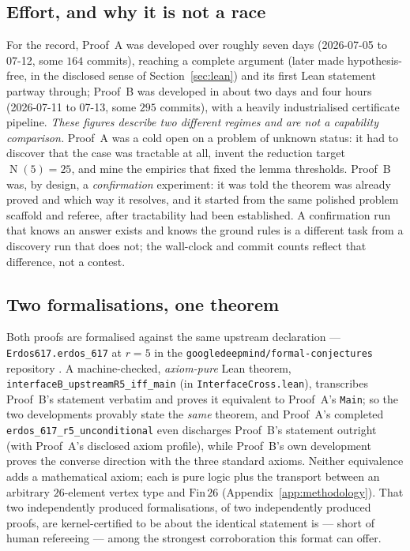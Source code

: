 \documentclass[11pt,reqno]{amsart}
\theoremstyle{definition}
\theoremstyle{remark}
\DeclareMathOperator{\Ncap}{N}
\begin{document}
\subsection{Effort, and why it is not a race}
For the record, Proof~A was developed over roughly seven days (2026-07-05 to 07-12, some
$164$ commits), reaching a complete argument (later made hypothesis-free, in the disclosed
sense of Section~\ref{sec:lean}) and its first Lean statement partway through; Proof~B was developed in about two days and four hours (2026-07-11 to
07-13, some $295$ commits), with a heavily industrialised certificate pipeline. \emph{These
figures describe two different regimes and are not a capability comparison.} Proof~A was a
cold open on a problem of unknown status: it had to discover that the case was tractable at
all, invent the reduction target $\Ncap(5)=25$, and mine the empirics that fixed the lemma
thresholds. Proof~B was, by design, a \emph{confirmation} experiment: it was told the
theorem was already proved and which way it resolves, and it started from the same polished
problem scaffold and referee, after tractability had been established. A confirmation run
that knows an answer exists and knows the ground rules is a different task from a discovery
run that does not; the wall-clock and commit counts reflect that difference, not a contest.

\subsection{Two formalisations, one theorem}
Both proofs are formalised against the same upstream declaration ---
\texttt{Erdos617.erdos\_617} at $r=5$ in the \texttt{google\-deepmind/formal-conjectures}
repository \cite{FC}. A machine-checked, \emph{axiom-pure} Lean theorem,
\texttt{interfaceB\_upstreamR5\_iff\_main} (in \texttt{InterfaceCross.lean}), transcribes
Proof~B's statement verbatim and proves it equivalent to Proof~A's \texttt{Main}; so the
two developments provably state the \emph{same} theorem, and Proof~A's completed
\texttt{erdos\_617\_r5\_unconditional} even discharges Proof~B's statement outright (with
Proof~A's disclosed axiom profile), while Proof~B's own development proves the converse
direction with the three standard axioms. Neither equivalence adds a mathematical axiom;
each is pure logic plus the transport between an arbitrary $26$-element vertex type and
$\mathrm{Fin}\,26$ (Appendix~\ref{app:methodology}). That two independently produced
formalisations, of two independently produced proofs, are kernel-certified to be about the
identical statement is --- short of human refereeing --- among the strongest corroboration
this format can offer.
\end{document}
